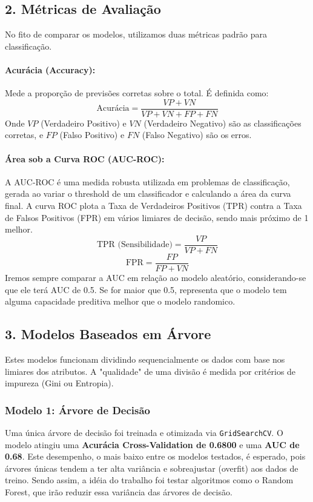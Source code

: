 \subsection*{2. Métricas de Avaliação}
No fito de comparar os modelos, utilizamos duas métricas padrão para classificação.

\paragraph{Acurácia (Accuracy):} Mede a proporção de previsões corretas sobre o total. É definida como:
$$ \text{Acurácia} = \frac{VP + VN}{VP + VN + FP + FN} $$
Onde $VP$ (Verdadeiro Positivo) e $VN$ (Verdadeiro Negativo) são as classificações corretas, e $FP$ (Falso Positivo) e $FN$ (Falso Negativo) são os erros.

\paragraph{Área sob a Curva ROC (AUC-ROC):} A AUC-ROC é uma medida robusta utilizada em problemas de classificação, gerada ao variar o threshold de um classificador e calculando a área da curva final. A curva ROC plota a Taxa de Verdadeiros Positivos (TPR) contra a Taxa de Falsos Positivos (FPR) em vários limiares de decisão, sendo mais próximo de 1 melhor.
$$ \text{TPR (Sensibilidade)} = \frac{VP}{VP + FN} $$
$$ \text{FPR} = \frac{FP}{FP + VN} $$
Iremos sempre comparar a AUC em relação ao modelo aleatório, considerando-se que ele terá AUC de 0.5. Se for maior que 0.5, representa que o modelo tem alguma capacidade preditiva melhor que o modelo randomico.
\vspace{10mm}
\subsection*{3. Modelos Baseados em Árvore}
Estes modelos funcionam dividindo sequencialmente os dados com base nos limiares dos atributos. A "qualidade" de uma divisão é medida por critérios de impureza (Gini ou Entropia).

\subsubsection*{Modelo 1: Árvore de Decisão}
Uma única árvore de decisão foi treinada e otimizada via \texttt{GridSearchCV}.
O modelo atingiu uma \textbf{Acurácia Cross-Validation de 0.6800}  e uma \textbf{AUC de 0.68}.
Este desempenho, o mais baixo entre os modelos testados, é esperado, pois árvores únicas tendem a ter alta variância e sobreajustar (overfit) aos dados de treino. Sendo assim, a idéia do trabalho foi testar algoritmos como o Random Forest, que irão reduzir essa variância das árvores de decisão.
\vspace{5mm}
